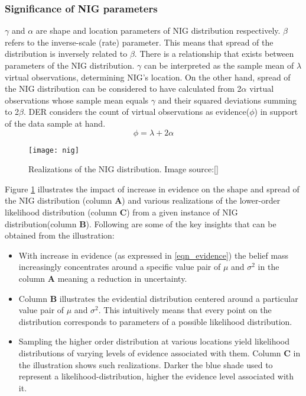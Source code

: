 	\subsubsection{Significance of NIG parameters}\label{sec_nig_param}
	$\gamma$  and $\alpha$ are shape and location parameters of NIG distribution respectively. $\beta$ refers to the inverse-scale (rate) parameter. This means that spread of the distribution is inversely related to $\beta$. There is a relationship that exists between parameters of the NIG distribution. $\gamma$ can be interpreted as the sample mean of $\lambda$ virtual observations, determining NIG's location. On the other hand, spread of the NIG distribution  can be considered to have calculated from 2$\alpha$ virtual observations whose sample mean equals $\gamma$ and their squared deviations summing to 2$\beta$. DER considers the count of virtual observations as evidence($\phi$) in support of the data sample at hand.   
	\begin{equation}\label{eqn_evidence}
		\phi = \lambda + 2\alpha
	\end{equation}
	\begin{figure}[h]
		\centering
		\texttt{[image: nig]}
		\caption{Realizations of the NIG distribution.  Image source:[\cite{amini2020deep}] }
		\label{fig_nig_realization}
	\end{figure}
	Figure \ref{fig_nig_realization} illustrates the impact of increase in evidence on the shape and spread of the NIG distribution (column \textbf{A}) and various realizations of the lower-order likelihood distribution (column \textbf{C}) from a given instance of NIG distribution(column \textbf{B}). Following are some of the key insights that can be obtained from the illustration:
	\begin{itemize}
		\item With increase in evidence (as expressed in \ref{eqn_evidence}) the belief mass increasingly concentrates around a specific value pair of $\mu$ and $\sigma^2$ in the column \textbf{A} meaning a reduction in uncertainty.
		\item Column \textbf{B} illustrates the evidential distribution  centered around a particular value pair of $\mu$ and $\sigma^2$. This intuitively means that every point on the distribution corresponds to parameters of a possible likelihood distribution. 
		\item  Sampling the higher order distribution at various locations yield likelihood distributions of varying levels of evidence associated with them. Column \textbf{C} in the illustration shows such realizations. Darker the blue shade used to represent a likelihood-distribution, higher the evidence level associated with it.  
	\end{itemize}
